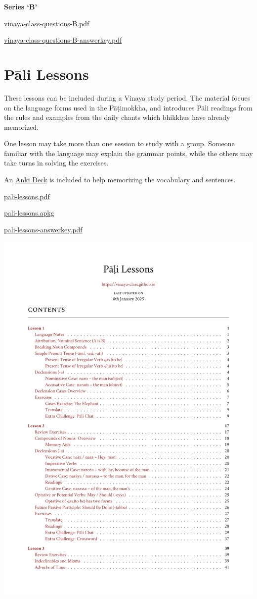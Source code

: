 \textbf{Series `B'}

\href{./includes/docs/vinaya-class-questions-B.pdf}{vinaya-class-questions-B.pdf}

\href{./includes/docs/vinaya-class-questions-B-answerkey.pdf}{vinaya-class-questions-B-answerkey.pdf}

\section{Pāli Lessons}

These lessons can be included during a Vinaya study period. The material
focues on the language forms used in the Pāṭimokkha, and introduces Pāli
readings from the rules and examples from the daily chants which
bhikkhus have already memorized.

One lesson may take more than one session to study with a group. Someone
familiar with the language may explain the grammar points, while the
others may take turns in solving the exercises.

An \href{https://apps.ankiweb.net/}{Anki Deck} is included to help
memorizing the vocabulary and sentences.

\href{./includes/docs/pali-lessons.pdf}{pali-lessons.pdf}

\href{./includes/docs/pali-lessons.apkg}{pali-lessons.apkg}

\href{./includes/docs/pali-lessons-answerkey.pdf}{pali-lessons-answerkey.pdf}

\href{./includes/docs/pali-lessons.pdf}{\includegraphics{./includes/docs/pali-lessons-thumb.png}}

